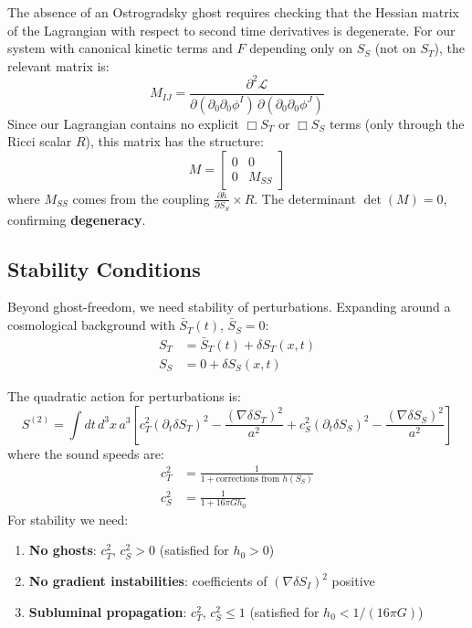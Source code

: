 \documentclass[12pt]{article}
\begin{document}
The absence of an Ostrogradsky ghost requires checking that the Hessian matrix of the Lagrangian with respect to second time derivatives is degenerate. For our system with canonical kinetic terms and $F$ depending only on $S_S$ (not on $S_T$), the relevant matrix is:
\begin{equation}
M_{IJ} = \frac{\partial^2 \mathcal{L}}{\partial (\partial_0 \partial_0 \phi^I)\, \partial (\partial_0 \partial_0 \phi^J)}
\end{equation}
Since our Lagrangian contains no explicit $\Box S_T$ or $\Box S_S$ terms (only through the Ricci scalar $R$), this matrix has the structure:
\begin{equation}
M =
\begin{bmatrix}
0 & 0 \\
0 & M_{SS}
\end{bmatrix}
\end{equation}
where $M_{SS}$ comes from the coupling $\frac{\partial h}{\partial S_S} \times R$. The determinant $\det(M) = 0$, confirming \textbf{degeneracy}.

\subsection{Stability Conditions}

Beyond ghost-freedom, we need stability of perturbations. Expanding around a cosmological background with $\bar{S}_T(t)$, $\bar{S}_S = 0$:
\begin{align}
S_T &= \bar{S}_T(t) + \delta S_T(x,t) \\
S_S &= 0 + \delta S_S(x,t)
\end{align}

The quadratic action for perturbations is:
\begin{equation}
S^{(2)} = \int dt\, d^3x\, a^3 \left[ c_T^2 (\partial_t \delta S_T)^2 - \frac{(\nabla \delta S_T)^2}{a^2}
+ c_S^2 (\partial_t \delta S_S)^2 - \frac{(\nabla \delta S_S)^2}{a^2} \right]
\end{equation}
where the sound speeds are:
\begin{align}
c_T^2 &= \frac{1}{1+\text{corrections from $h(S_S)$}} \\
c_S^2 &= \frac{1}{1+16\pi G h_0}
\end{align}
For stability we need:
\begin{enumerate}
    \item \textbf{No ghosts}: $c_T^2,\, c_S^2 > 0$ \hspace{1em} (satisfied for $h_0 > 0$)
    \item \textbf{No gradient instabilities}: coefficients of $(\nabla \delta S_I)^2$ positive
    \item \textbf{Subluminal propagation}: $c_T^2,\, c_S^2 \leq 1$ \hspace{1em} (satisfied for $h_0 < 1/(16\pi G)$)
\end{enumerate}
\end{document}
